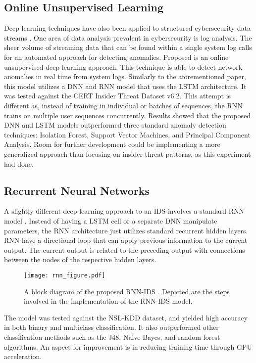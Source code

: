 \documentclass[letterpaper, 10 pt, conference]{ieeeconf}
\begin{document}
\hfill
\subsection{Online Unsupervised Learning}
Deep learning techniques have also been applied to structured cybersecurity data streams \cite{c5}. One area of data analysis prevalent in cybersecurity is log analysis. The sheer volume of streaming data that can be found within a single system log calls for an automated approach for detecting anomalies. Proposed is an online unsupervised deep learning approach. This technique is able to detect network anomalies in real time from system logs. Similarly to the aforementioned paper, this model utilizes a DNN and RNN model that uses the LSTM architecture. It was tested against the CERT Insider Threat Dataset v6.2. This attempt is different as, instead of training in individual or batches of sequences, the RNN trains on multiple user sequences concurrently. Results showed that the proposed DNN and LSTM models outperformed three standard anomaly detection techniques: Isolation Forest, Support Vector Machines, and Principal Component Analysis. Room for further development could be implementing a more generalized approach than focusing on insider threat patterns, as this experiment had done.

\hfill
\subsection{Recurrent Neural Networks}
A slightly different deep learning approach to an IDS involves a standard RNN model \cite{c6}. Instead of having a LSTM cell or a separate DNN manipulate parameters, the RNN architecture just utilizes standard recurrent hidden layers. RNN have a directional loop that can apply previous information to the current output. The current output is related to the preceding output with connections between the nodes of the respective hidden layers.

\begin{figure}[ht!] %
\centering
\hspace*{0.4cm}
\texttt{[image: rnn\_figure.pdf]}
\vspace*{-25mm}
\caption{A block diagram of the proposed RNN-IDS \cite{c6}. Depicted are the steps involved in the implementation of the RNN-IDS model.}
\label{rnn_figure}
\end{figure}

The model was tested against the NSL-KDD dataset, and yielded high accuracy in both binary and multiclass classification. It also outperformed other classification methods such as the J48, Naive Bayes, and random forest algorithms. An aspect for improvement is in reducing training time through GPU acceleration.
\end{document}
